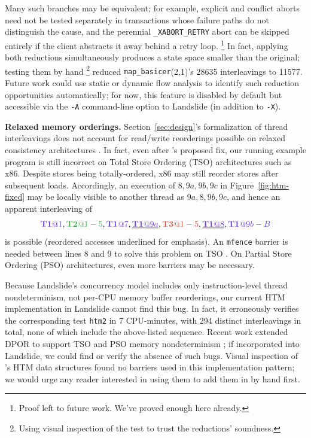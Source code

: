 \documentclass[10pt]{sigplanconf}
\begin{document}
Many such branches may be equivalent;
for example,
explicit and conflict aborts need not be tested separately in transactions
whose failure paths do not distinguish the cause,
and the perennial {\tt \_XABORT\_RETRY} abort can be skipped entirely
if the client abstracts it away behind a retry loop.%
\footnote{Proof left to future work. We've proved enough here already.}
In fact, applying both reductions simultaneously
produces a state space smaller than the original;
testing them by hand
\footnote{Using visual inspection of the test to trust the reductions' soundness.}
reduced {\tt map\_basicer}(2,1)'s 28635 interleavings to 11577.
%
%
Future work could use static or dynamic flow analysis to
identify such reduction opportunities automatically;
for now, this feature is disabled by default but accessible via the {\tt -A} command-line option
to Landslide (in addition to {\tt -X}).

{\bf Relaxed memory orderings.}
Section~\ref{sec:design}'s formalization of thread interleavings does not account for read/write reorderings
possible on relaxed consistency architectures \cite{memory-consistency-models}.
In fact,
even after \cite{htm-mario}'s proposed fix,
our running example program is still incorrect on Total Store Ordering (TSO) architectures such as x86.
Despite stores being totally-ordered, x86 may still reorder stores after subsequent loads.
Accordingly, an execution of $8,9a,9b,9c$ in Figure~\ref{fig:htm-fixed}
may be locally visible to another thread as $9a,8,9b,9c$,
and hence an apparent interleaving of
\[
	\tiat{1},\tjat{1-5},\tiat{7},\underline{\tiat{9a}},\tkat{1-5},\underline{\tiat{8}},\tiat{9b-B}
\]
is possible
(reordered accesses underlined for emphasis).
An {\tt mfence} barrier is needed between lines 8 and 9 to solve this problem on TSO \cite{tsx-need-barrier}.
On Partial Store Ordering (PSO) architectures, even more barriers may be necessary.

Because Landslide's concurrency model includes only instruction-level thread nondeterminism,
not per-CPU memory buffer reorderings,
our current HTM implementation in Landslide cannot find this bug.
In fact, it erroneously verifies the corresponding test {\tt htm2} in 7 CPU-minutes,
with 294 distinct interleavings in total,
none of which include the above-listed sequence.
Recent work extended DPOR to support TSO and PSO memory nondeterminism \cite{tsopso};
if incorporated into Landslide, we could find or verify the absence of such bugs.
Visual inspection of \cite{htm-mario}'s HTM data structures found no barriers used in this implementation pattern;
we would urge any reader interested in using them to add them in by hand first.
\end{document}
